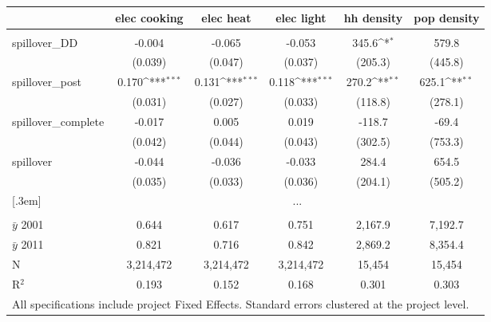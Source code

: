 {\footnotesize
{}  
\def\sym#1{\ifmmode^{#1}\else\(^{#1}\)\fi}
\begin{tabular}{l*{5}{c}}
          &\multicolumn{1}{c}{elec cooking} &\multicolumn{1}{c}{elec heat}  &\multicolumn{1}{c}{elec light}         &\multicolumn{1}{c}{hh density}         &\multicolumn{1}{c}{pop density}      \\[0.2em]
\hline\\[-0.9em]
\rowcolor{o} spillover\_DD  & -0.004   &   -0.065  &   -0.053   &  345.6\sym{*}  &  579.8     \\
\rowcolor{o}                &  (0.039) &  (0.047)  &  (0.037)   &(205.3)         &(445.8)     \\ 
[.5em]
spillover\_post & 0.170\sym{***}&0.131\sym{***} &0.118\sym{***} & 270.2\sym{**} &  625.1\sym{**} \\
                & (0.031)       &  (0.027)      &  (0.033)      &(118.8)        &(278.1)       \\       
[.5em]
spillover\_complete &  -0.017    &    0.005    &    0.019     & -118.7      &  -69.4        \\
                    &  (0.042)   &  (0.044)    &  (0.043)     &(302.5)      &(753.3)        \\
[.5em]
spillover &   -0.044    &   -0.036   &   -0.033    &  284.4   &  654.5         \\
          &  (0.035)    &  (0.033)   &  (0.036)    &(204.1)   &(505.2)         \\
[.3em]
& \multicolumn{5}{c}{...}\\
[.5em]
\hline \\[-0.9em]
$\bar{y}$ 2001& 0.644      &    0.617       &    0.751       &2,167.9      &7,192.7         \\
$\bar{y}$ 2011& 0.821      &    0.716       &    0.842       &2,869.2      &8,354.4         \\
N          &  3,214,472    &  3,214,472     &  3,214,472     & 15,454        &    15,454         \\
R$^{2}$    & 0.193         &    0.152       &    0.168       &    0.301      &    0.303         \\
\hline
\multicolumn{6}{l}{\tiny All specifications include project Fixed Effects. Standard errors clustered at the project level.}
\end{tabular}
}
